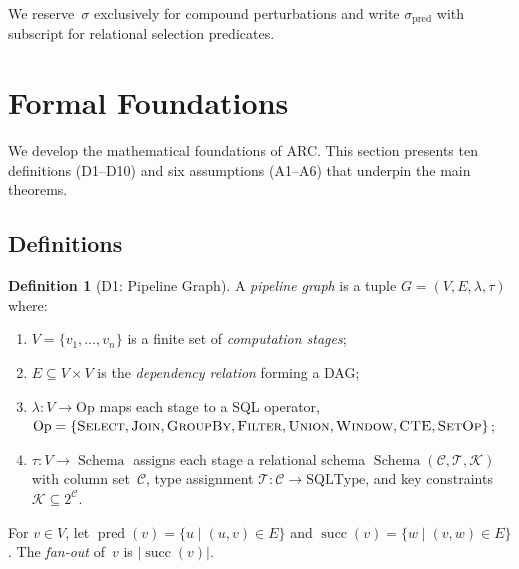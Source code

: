 \documentclass[11pt,a4paper]{article}
\theoremstyle{definition}
\newtheorem{definition}[theorem]{Definition}
\newcommand{\Op}{\mathrm{Op}}
\DeclareMathOperator{\pred}{pred}
\DeclareMathOperator{\succ}{succ}
\DeclareMathOperator{\Schema}{Schema}
\begin{document}
We reserve~$\sigma$ exclusively for compound perturbations and write
$\sigma_{\mathrm{pred}}$ with subscript for relational selection predicates.


\section{Formal Foundations}
\label{sec:formal}

We develop the mathematical foundations of ARC.  This section presents ten
definitions (D1--D10) and six assumptions (A1--A6) that underpin the main
theorems.

\subsection{Definitions}
\label{sec:definitions}

\begin{definition}[D1: Pipeline Graph]\label{def:pipeline-graph}
A \emph{pipeline graph} is a tuple $G = (V, E, \lambda, \tau)$ where:
\begin{enumerate}[nosep]
  \item $V = \{v_1, \ldots, v_n\}$ is a finite set of \emph{computation stages};
  \item $E \subseteq V \times V$ is the \emph{dependency relation} forming a DAG;
  \item $\lambda\colon V \to \Op$ maps each stage to a SQL operator,
    $\Op = \{\textsc{Select}, \textsc{Join}, \textsc{GroupBy}, \textsc{Filter},
     \textsc{Union}, \textsc{Window}, \textsc{CTE}, \textsc{SetOp}\}$;
  \item $\tau\colon V \to \Schema$ assigns each stage a relational schema
    $\Schema(\mathcal{C}, \mathcal{T}, \mathcal{K})$ with column set~$\mathcal{C}$,
    type assignment $\mathcal{T}\colon \mathcal{C} \to \mathrm{SQLType}$,
    and key constraints $\mathcal{K} \subseteq 2^{\mathcal{C}}$.
\end{enumerate}
For $v \in V$, let $\pred(v) = \{u \mid (u,v) \in E\}$ and
$\succ(v) = \{w \mid (v,w) \in E\}$.
The \emph{fan-out} of~$v$ is $|\succ(v)|$.
\end{definition}
\end{document}
